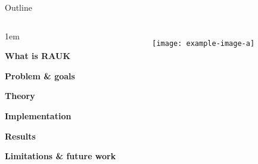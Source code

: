 \begin{frame}{Outline}
    \begin{columns}
        \begin{itemize-size}{1em} 
            \item \textbf{What is RAUK}
            \item \textbf{Problem \& goals}
            \item \textbf{Theory}
            \item \textbf{Implementation}
            \item \textbf{Results}
            \item \textbf{Limitations \& future work}
        \end{itemize-size}
        
        \begin{figure}
            \centering
            \texttt{[image: example-image-a]}
            \label{fig:handshake_agenda}
        \end{figure}
    \end{columns}
\end{frame}


